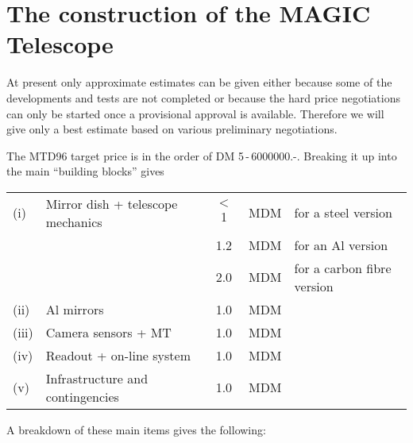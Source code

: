 
\section{The construction of the MAGIC Telescope}

\medskip At present only approximate estimates can be given either because
some of the developments and tests are not completed or because the hard
price negotiations can only be started once a provisional approval is
available. Therefore we will give only a best estimate based on various
preliminary negotiations.

The MTD96 target price is in the order of DM 5\,-\,6000000.-. Breaking it up
into the main ``building blocks'' gives

\medskip
\begin{tabular}{llccl}
(i) & Mirror dish + telescope mechanics & $<$ 1 & MDM & for a steel version \\ 
    &                                   & 1.2 & MDM & for an Al version \\ 
    &                                   & 2.0   & MDM & for a carbon fibre version\footnotemark  \\ 
(ii) & Al mirrors                       & 1.0    & MDM & \\ 
(iii) & Camera sensors + MT & 1.0 & MDM & \\ 
(iv) & Readout + on-line system & 1.0 & MDM & \\ 
(v) & Infrastructure and contingencies & 1.0 & MDM & \\ 
\end{tabular}

\newpage

\noindent
A breakdown of these main items gives the following:\\

